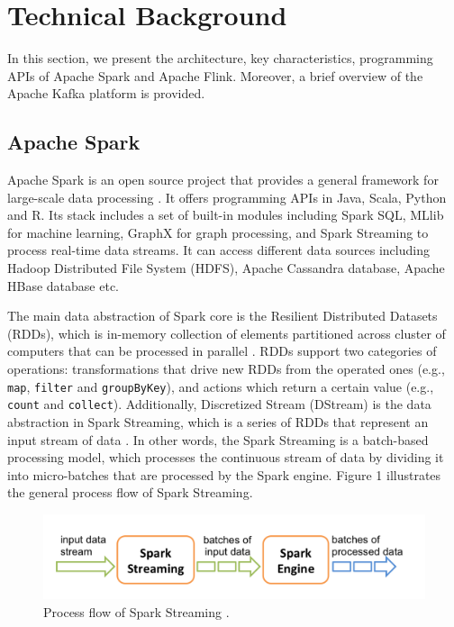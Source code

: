 \documentclass[]{article}
\begin{document}
\section{Technical Background}
 In this section, we present the architecture, key characteristics, programming APIs  of Apache Spark and Apache Flink. Moreover, a brief overview of the Apache Kafka platform is  provided.

\subsection{Apache Spark}

\par Apache Spark is an open source project that provides a general framework for large-scale data processing \cite{spark}. It offers programming APIs in Java, Scala, Python and R. Its stack includes a set of built-in modules including Spark SQL, MLlib for machine learning, GraphX for graph processing, and Spark Streaming to process real-time data streams. It can access different data sources including Hadoop Distributed File System (HDFS), Apache Cassandra database, Apache HBase database etc.

\par The main data abstraction of Spark core is the Resilient Distributed Datasets (RDDs), which is in-memory collection of elements partitioned across cluster of computers that can be processed in parallel \cite{rdd}. RDDs support two categories of operations: transformations that drive new RDDs from the operated ones (e.g., \texttt{map}, \texttt{filter} and \texttt{groupByKey}), and actions which return a certain value (e.g., \texttt{count} and \texttt{collect}). Additionally, Discretized Stream (DStream) is the data abstraction in Spark Streaming, which is a series of RDDs that represent an input stream of data \cite{spark_streaming}. In other words, the Spark Streaming is a batch-based processing model, which processes the continuous stream of data by dividing it into micro-batches that are  processed by the Spark engine. Figure 1 illustrates the general process flow of Spark Streaming. 


\begin{figure}[h]
 
  \centering
    \includegraphics[width=.9\textwidth, height=.3\textheight]{streaming-flow.png}
     \caption{ Process flow of Spark Streaming \cite{spark_streaming}.}
\end{figure} 
\end{document}
